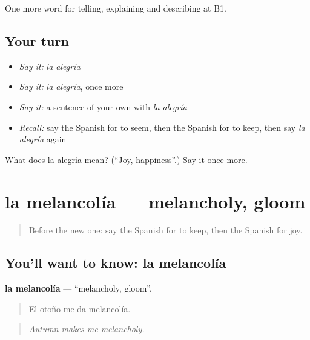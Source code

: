 \begin{grammarlens}[title={What you've built}]
One more word for telling, explaining and describing at B1.
\end{grammarlens}

\subsection*{Your turn}
\begin{itemize}
\raggedright
  \item \emph{Say it:} \emph{la alegría}
  \item \emph{Say it:} \emph{la alegría}, once more
  \item \emph{Say it:} a sentence of your own with \emph{la alegría}
  \item \emph{Recall:} say the Spanish for to seem, then the Spanish for to keep, then say \emph{la alegría} again
\end{itemize}

\begin{tcolorbox}[breakable,colback=teal!4,colframe=teal!35!black,title={Before you move on}]
What does la alegría mean? (\textquotedblleft{}Joy, happiness\textquotedblright{}.) Say it once more.
\end{tcolorbox}
\section[la melancolía]{la melancolía — melancholy, gloom}

\label{lesson:ES-C704-melancolia}



\begin{quote}
Before the new one: say the Spanish for to keep, then the Spanish for joy.
\end{quote}

\subsection*{You'll want to know: la melancolía}
\textbf{la melancolía} — \textquotedblleft{}melancholy, gloom\textquotedblright{}.

\begin{quote}
El otoño me da melancolía.
\end{quote}

\begin{quote}
\emph{Autumn makes me melancholy.}
\end{quote}

